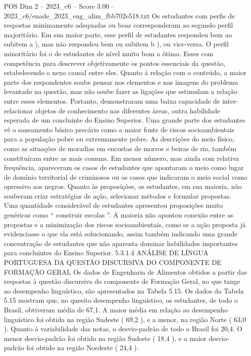 \begin{textsample}{POS Dim 2 – 2023\_c6 – Score 3.00 – 2023\_c6/enade\_2023\_eng\_alim\_fbb702e518.txt}
Os estudantes com perfis de respostas minimamente adequadas ou boas corresponderam ao segundo perfil majoritário.
Em sua maior parte, esse perfil de estudantes respondeu bem ao subitem a ), mas não respondeu bem ou subitem b ), ou vice-versa.
O perfil minoritário foi o de estudantes de nível muito bom a ótimo.
Esses com competência para descrever objetivamente os pontos essenciais da questão, estabelecendo o nexo causal entre eles.
Quanto à relação com o conteúdo, a maior parte dos respondentes soube pensar nos elementos e nas imagens do problema levantado na questão, mas não soube fazer as ligações que estimulam a relação entre esses elementos.
Portanto, demonstraram uma baixa capacidade de inter-relacionar objetos de conhecimento nas diferentes áreas, outra habilidade esperada de um concluinte do Ensino Superior.
Uma grande parte dos estudantes vê o saneamento básico precário como a maior fonte de riscos socioambientais para a população pobre ou extremamente pobre.
As descrições do meio físico, como as situações de moradias em encostas de morros e beiras de rio, também constituíram entre as mais comuns.
Em menor número, mas ainda com relativa frequência, apareceram os casos de estudantes que apontaram o meio como lugar de domínio territorial de criminosos ou os casos que indicaram o meio social como opressivo aos negros.
Quanto às proposições, os estudantes, em sua maioria, não souberam criar estratégias de ação, selecionar métodos e formular propostas.
Uma quantidade considerável de estudantes apresentou proposições muito genéricas como “ construir escolas ”.
A maioria não apontou conexão entre as propostas e a minimização dos riscos socioambientais, como se a ação proposta já evidenciasse o que ela está solucionando, assim também indicando uma grande concentração de estudantes que não aparenta dominar habilidades importantes para concluintes do Ensino Superior. 5.3.1.4 ANÁLISE DE LÍNGUA PORTUGUESA DA QUESTÃO DISCURSIVA DO COMPONENTE DE FORMAÇÃO GERAL Os dados de Engenharia de Alimentos obtidos a partir das respostas à questão discursiva do componente de Formação Geral, no que tange ao desempenho linguístico, são apresentados na Tabela 5.15.
Os dados da Tabela 5.15 mostram que, no quesito desempenho linguístico, os estudantes, de todo o Brasil, obtiveram média de 67,1.
A maior média em relação ao desempenho linguístico foi obtida na região Sudeste ( 69,2 ), e a menor, na região Norte ( 63,0 ).
Quanto à variabilidade das notas, o desvio-padrão de todo o Brasil foi 20,4.
O menor desvio-padrão foi obtido na região Sudeste ( 18,4 ), e o maior desvio-padrão foi obtido na região Nordeste ( 24,4 ).

\end{textsample}
